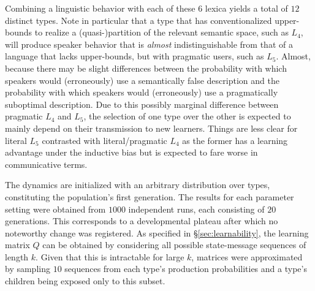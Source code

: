 \documentclass[a4paper]{article}
\begin{document}
Combining a linguistic behavior with each of these $6$ lexica yields a total of $12$ distinct types. Note in particular  that a type that has conventionalized upper-bounds to realize a (quasi-)partition of the relevant semantic space, such as $L_4$, will produce speaker behavior that is {\em almost} indistinguishable from that of a language that lacks upper-bounds, but with pragmatic users, such as $L_5$. Almost, because there may be slight differences between the probability with which speakers would (erroneously) use a semantically false description and the probability with which speakers would (erroneously) use a pragmatically suboptimal description. Due to this possibly marginal difference between pragmatic $L_4$ and $L_5$, the selection of one type over the other is expected to mainly depend on their transmission to new learners. Things are less clear for literal $L_5$ contrasted with literal/pragmatic $L_4$ as the former has a learning advantage under the inductive bias but is expected to fare worse in communicative terms.


The dynamics are initialized with an arbitrary distribution over types, constituting the population's first generation. The results for each parameter setting were obtained from $1000$ independent runs, each consisting of $20$ generations. This corresponds to a developmental plateau after which no noteworthy change was registered. As specified in \S\ref{sec:learnability}, the learning matrix $Q$ can be obtained by considering all possible state-message sequences of length $k$. Given that this is intractable for large $k$, matrices were approximated by sampling $10$ sequences from each type's production probabilities and a type's children being exposed only to this subset. 

%
\end{document}
